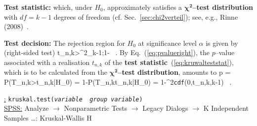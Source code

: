 \medskip
\noindent
\textbf{Test statistic:}
%
\be
{}
\ee
%
which, under $H_{0}$, approximately satisfies a 
$\boldsymbol{\chi^{2}}$\textbf{--test distribution} with $df=k-1$
degrees of freedom (cf. Sec.~\ref{sec:chi2verteil}); see, e.g.,
Rinne (2008)~.

\medskip
\noindent
\textbf{Test decision:}  The rejection region for $H_{0}$ at 
significance level $\alpha$ is given by (right-sided test)
%
\be
t_{n,k}>\chi^{2}_{k-1;1-\alpha} \ .
\ee
%
By Eq.~(\ref{eq:pvalueright}), the $p$--value associated with a
realisation $t_{n,k}$ of the \textbf{test
statistic}~(\ref{eq:kruwalteststat}), which is to be
calculated from the $\boldsymbol{\chi^{2}}$\textbf{--test
distribution}, amounts to
%
\be
p = P(T_{n,k}>t_{n,k}|H_{0}) = 1-P(T_{n,k}\leq t_{n,k}|H_{0})
= 1-\chi^{2}\texttt{cdf}(0,t_{n,k},k-1) \ .
\ee
%

\medskip
\noindent
\underline{\R:}
\texttt{kruskal.test(\textit{variable}~\texttildelow~\textit{group
variable})} \\
\underline{SPSS:} Analyze $\rightarrow$ Nonparametric Tests
$\rightarrow$ Legacy Dialogs $\rightarrow$ K Independent Samples
\ldots: Kruskal-Wallis H

